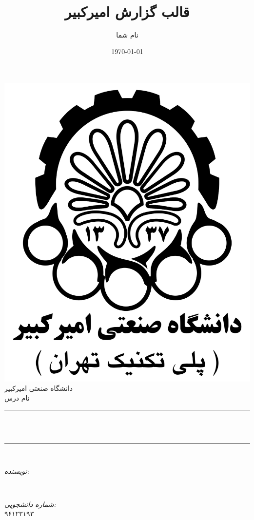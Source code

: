 \documentclass[12pt]{article}
\title{قالب گزارش امیرکبیر}                             %
\author{نام شما}                               %
\date{\today}                                           %
\makeatletter
\let\thetitle\@title
\let\theauthor\@author
\makeatother
\begin{document}

\begin{titlepage}
    \centering
    \vspace*{0.5 cm}
    \includegraphics[scale = 0.1]{images/logo.png}\\[1.0 cm]   %
    \textsc{\LARGE دانشگاه صنعتی امیرکبیر}\\[2.0 cm]   %
    \textsc{\Large نام درس}\\[0.5 cm]               %
    \rule{\linewidth}{0.2 mm} \\[0.4 cm]
    { \huge \bfseries \thetitle}\\
    \rule{\linewidth}{0.2 mm} \\[1.5 cm]
    
    \begin{minipage}{0.4\textwidth}
        \begin{flushright} \large
            \emph{نویسنده:}\\
            \theauthor
        \end{flushright}
    \end{minipage}~
    \begin{minipage}{0.4\textwidth}
        \begin{flushleft} \large
            \emph{شماره دانشجویی:} \\
            ۹۶۱۲۳۱۹۳                                   %
        \end{flushleft}
    \end{minipage}\\[2 cm]
    

\end{titlepage}
\end{document}
